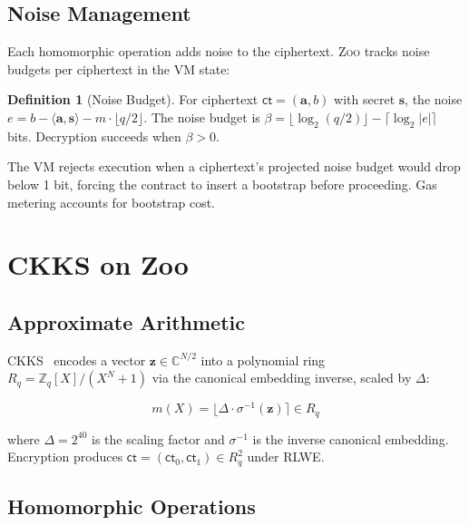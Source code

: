 \documentclass[11pt,letterpaper]{article}
\theoremstyle{definition}
\newtheorem{definition}{Definition}
\theoremstyle{remark}
\newcommand{\Zoo}{\textsc{Zoo}}
\newcommand{\CKKS}{\textsc{CKKS}}
\newcommand{\RLWE}{\textsc{RLWE}}
\begin{document}
\subsection{Noise Management}

Each homomorphic operation adds noise to the ciphertext. \Zoo{} tracks noise budgets per ciphertext in the VM state:

\begin{definition}[Noise Budget]
For ciphertext $\mathsf{ct} = (\mathbf{a}, b)$ with secret $\mathbf{s}$, the noise $e = b - \langle \mathbf{a}, \mathbf{s} \rangle - m \cdot \lfloor q/2 \rfloor$. The noise budget is $\beta = \lfloor \log_2(q/2) \rfloor - \lceil \log_2 |e| \rceil$ bits. Decryption succeeds when $\beta > 0$.
\end{definition}

The VM rejects execution when a ciphertext's projected noise budget would drop below 1 bit, forcing the contract to insert a bootstrap before proceeding. Gas metering accounts for bootstrap cost.

\section{CKKS on Zoo}
\label{sec:ckks}

\subsection{Approximate Arithmetic}

\CKKS{}~\cite{cheon2017ckks} encodes a vector $\mathbf{z} \in \mathbb{C}^{N/2}$ into a polynomial ring $R_q = \mathbb{Z}_q[X]/(X^N+1)$ via the canonical embedding inverse, scaled by $\Delta$:

\begin{equation}
  m(X) = \lfloor \Delta \cdot \sigma^{-1}(\mathbf{z}) \rceil \in R_q
\end{equation}

\noindent where $\Delta = 2^{40}$ is the scaling factor and $\sigma^{-1}$ is the inverse canonical embedding. Encryption produces $\mathsf{ct} = (\mathsf{ct}_0, \mathsf{ct}_1) \in R_q^2$ under \RLWE{}.

\subsection{Homomorphic Operations}
\end{document}

